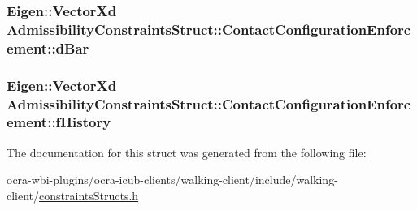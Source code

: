 \hypertarget{structAdmissibilityConstraintsStruct_1_1ContactConfigurationEnforcement_a0061c6cddeac4d3cb4d5bfc68cb21026}{
\subsubsection[{d\-Bar}]{\setlength{\rightskip}{0pt plus 5cm}\-Eigen\-::\-Vector\-Xd {\bf \-Admissibility\-Constraints\-Struct\-::\-Contact\-Configuration\-Enforcement\-::d\-Bar}}}\label{structAdmissibilityConstraintsStruct_1_1ContactConfigurationEnforcement_a0061c6cddeac4d3cb4d5bfc68cb21026}
\hypertarget{structAdmissibilityConstraintsStruct_1_1ContactConfigurationEnforcement_a3ca6a4f62e9f1c5c5465fce49020a72b}{
\subsubsection[{f\-History}]{\setlength{\rightskip}{0pt plus 5cm}\-Eigen\-::\-Vector\-Xd {\bf \-Admissibility\-Constraints\-Struct\-::\-Contact\-Configuration\-Enforcement\-::f\-History}}}\label{structAdmissibilityConstraintsStruct_1_1ContactConfigurationEnforcement_a3ca6a4f62e9f1c5c5465fce49020a72b}


\-The documentation for this struct was generated from the following file\-:\begin{DoxyCompactItemize}
\item 
ocra-\/wbi-\/plugins/ocra-\/icub-\/clients/walking-\/client/include/walking-\/client/\hyperlink{constraintsStructs_8h}{constraints\-Structs.\-h}\end{DoxyCompactItemize}
